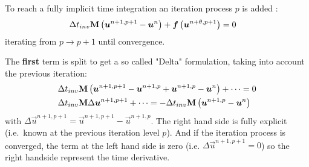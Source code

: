 To reach a fully implicit time integration an iteration process $p$ is added \citep[eqs.\ 15/16]{Borsboom2019a}:
\begin{align}
    &\Delta t_{inv} \mbox{\boldmath ${\rm M}$} \left( \bm{u}^{n+1,p+1} - \bm{u}^{n} \right)  +
    \bm{f} \left( \bm{u}^{n+\theta, p+1} \right) = 0
    \label{eq:1D_iteration}
\end{align}
iterating from $p \rightarrow p+1$ until convergence.

The \textbf{first} term is split to get a so called "Delta" formulation, taking into account the previous iteration:
\begin{align}
    &\Delta t_{inv} \mbox{\boldmath ${\rm M}$} \left( \bm{u}^{n+1,p+1} - \bm{u}^{n+1,p} + \bm{u}^{n+1,p} - \bm{u}^{n} \right) + \dots = 0
    \\
    & \Delta t_{inv} \mbox{\boldmath ${\rm M}$} \Delta \bm{u}^{n+1,p+1} + \dots  =
    - \Delta t_{inv} \mbox{\boldmath ${\rm M}$} \left( \bm{u}^{n+1,p} - \bm{u}^{n} \right)
\end{align}
with $\Delta \vec{u}^{n+1,p+1} = \vec{u}^{n+1,p+1} - \vec{u}^{n+1,p}$.
The right hand side is fully explicit (i.e.\ known at the previous iteration level $p$).
And if the iteration process is converged, the term at the left hand side is zero (i.e. $\Delta \vec{u}^{n+1,p+1} = 0$) so the right handside represent the time derivative.


